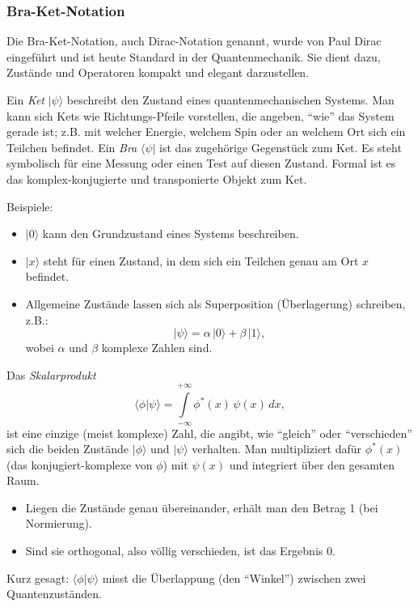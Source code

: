 \subsubsection{Bra-Ket-Notation\label{fourier:subsubsection:braKetNotation}} %
Die Bra-Ket-Notation, auch Dirac-Notation genannt, wurde von Paul Dirac eingeführt und ist heute Standard in der Quantenmechanik.
Sie dient dazu, Zustände und Operatoren kompakt und elegant darzustellen.

Ein \emph{Ket} $|\psi\rangle$ beschreibt den Zustand eines quantenmechanischen Systems.
Man kann sich Kets wie Richtungs-Pfeile vorstellen, die angeben, ``wie'' das System gerade ist;
z.B. mit welcher Energie, welchem Spin oder an welchem Ort sich ein Teilchen befindet.
Ein \emph{Bra} $\langle\psi|$ ist das zugehörige Gegenstück zum Ket.
Es steht symbolisch für eine Messung oder einen Test auf diesen Zustand.
Formal ist es das komplex-konjugierte und transponierte Objekt zum Ket.

Beispiele:
\begin{itemize}
  \item $|0\rangle$ kann den Grundzustand eines Systems beschreiben.
  \item $|x\rangle$ steht für einen Zustand, in dem sich ein Teilchen genau am Ort $x$ befindet.
  \item Allgemeine Zustände lassen sich als Superposition (Überlagerung) schreiben, z.B.:
  \[
    |\psi\rangle = \alpha\,|0\rangle + \beta\,|1\rangle,
  \]
  wobei $\alpha$ und $\beta$ komplexe Zahlen sind.
\end{itemize}

Das \emph{Skalarprodukt}
\begin{equation}
  \langle \phi | \psi \rangle = \int\limits_{-\infty}^{+\infty} \phi^*(x)\,\psi(x)\,dx,
\end{equation}
ist eine einzige (meist komplexe) Zahl, die angibt, wie ``gleich'' oder ``verschieden'' sich die beiden Zustände $|\phi\rangle$ und $|\psi\rangle$ verhalten.
Man multipliziert dafür $\phi^*(x)$ (das konjugiert-komplexe von $\phi$) mit $\psi(x)$ und integriert über den gesamten Raum.
\begin{itemize}
	\item Liegen die Zustände genau übereinander, erhält man den Betrag 1 (bei Normierung).
	\item Sind sie orthogonal, also völlig verschieden, ist das Ergebnis 0.
\end{itemize}
Kurz gesagt:
$\langle \phi | \psi \rangle$ misst die Überlappung (den ``Winkel'') zwischen zwei Quantenzuständen.

